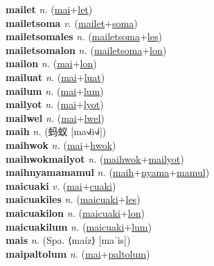 \textbf{mailet} \textit{n.} (\hyperref[mai]{mai}+\hyperref[let]{let})
 \label{mailet} \\
\textbf{mailetsoma} \textit{v.} (\hyperref[mailet]{mailet}+\hyperref[soma]{soma})
 \label{mailetsoma} \\
\textbf{mailetsomales} \textit{n.} (\hyperref[mailetsoma]{mailetsoma}+\hyperref[les]{les})
 \label{mailetsomales} \\
\textbf{mailetsomalon} \textit{n.} (\hyperref[mailetsoma]{mailetsoma}+\hyperref[lon]{lon})
 \label{mailetsomalon} \\
\textbf{mailon} \textit{n.} (\hyperref[mai]{mai}+\hyperref[lon]{lon})
 \label{mailon} \\
\textbf{mailuat} \textit{n.} (\hyperref[mai]{mai}+\hyperref[luat]{luat})
 \label{mailuat} \\
\textbf{mailum} \textit{n.} (\hyperref[mai]{mai}+\hyperref[lum]{lum})
 \label{mailum} \\
\textbf{mailyot} \textit{n.} (\hyperref[mai]{mai}+\hyperref[lyot]{lyot})
 \label{mailyot} \\
\textbf{mailwel} \textit{n.} (\hyperref[mai]{mai}+\hyperref[lwel]{lwel})
 \label{mailwel} \\
\textbf{maih} \textit{n.} ({\chinese{}蚂蚁} [ma˧˩˧i˧˩˧])
 \label{maih} \\
\textbf{maihwok} \textit{n.} (\hyperref[mai]{mai}+\hyperref[hwok]{hwok})
 \label{maihwok} \\
\textbf{maihwokmailyot} \textit{n.} (\hyperref[maihwok]{maihwok}+\hyperref[mailyot]{mailyot})
 \label{maihwokmailyot} \\
\textbf{maihnyamamamul} \textit{n.} (\hyperref[maih]{maih}+\hyperref[nyama]{nyama}+\hyperref[mamul]{mamul})
 \label{maihnyamamamul} \\
\textbf{maicuaki} \textit{v.} (\hyperref[mai]{mai}+\hyperref[cuaki]{cuaki})
 \label{maicuaki} \\
\textbf{maicuakiles} \textit{n.} (\hyperref[maicuaki]{maicuaki}+\hyperref[les]{les})
 \label{maicuakiles} \\
\textbf{maicuakilon} \textit{n.} (\hyperref[maicuaki]{maicuaki}+\hyperref[lon]{lon})
 \label{maicuakilon} \\
\textbf{maicuakilum} \textit{n.} (\hyperref[maicuaki]{maicuaki}+\hyperref[lum]{lum})
 \label{maicuakilum} \\
\textbf{mais} \textit{n.} (Spa. ⟨maíz⟩ [maˈis])
 \label{mais} \\
\textbf{maipaltolum} \textit{n.} (\hyperref[mai]{mai}+\hyperref[paltolum]{paltolum})
